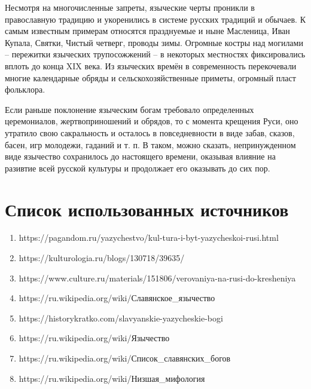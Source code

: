 \documentclass[a4paper, 12pt]{report}
\begin{document}
Несмотря на многочисленные запреты, языческие черты проникли в православную традицию и укоренились в системе русских традиций и обычаев. К самым известным примерам относятся празднуемые и ныне Масленица, Иван Купала, Святки, Чистый четверг, проводы зимы. Огромные костры над могилами – пережитки языческих трупосожжений – в некоторых местностях фиксировались вплоть до конца XIX века. Из языческих времён в современность перекочевали многие календарные обряды и сельскохозяйственные приметы, огромный пласт фольклора.

Если раньше поклонение языческим богам требовало определенных церемониалов, жертвоприношений и обрядов, то с момента крещения Руси, оно утратило свою сакральность и осталось в повседневности в виде забав, сказов, басен, игр молодежи, гаданий и т. п. В таком, можно сказать, непринужденном виде язычество сохранилось до настоящего времени, оказывая влияние на разивтие всей русской культуры и продолжает его оказывать до сих пор.

\chapter*{Список использованных источников}
 
\begin{enumerate}
	\item https://pagandom.ru/yazychestvo/kul-tura-i-byt-yazycheskoi-rusi.html
	\item https://kulturologia.ru/blogs/130718/39635/
	\item https://www.culture.ru/materials/151806/verovaniya-na-rusi-do-kresheniya
	\item https://ru.wikipedia.org/wiki/Славянское\_язычество
	\item https://historykratko.com/slavyanskie-yazycheskie-bogi
	\item https://ru.wikipedia.org/wiki/Язычество
	\item https://ru.wikipedia.org/wiki/Список\_славянских\_богов
	\item https://ru.wikipedia.org/wiki/Низшая\_мифология
\end{enumerate}
 
\end{document}
